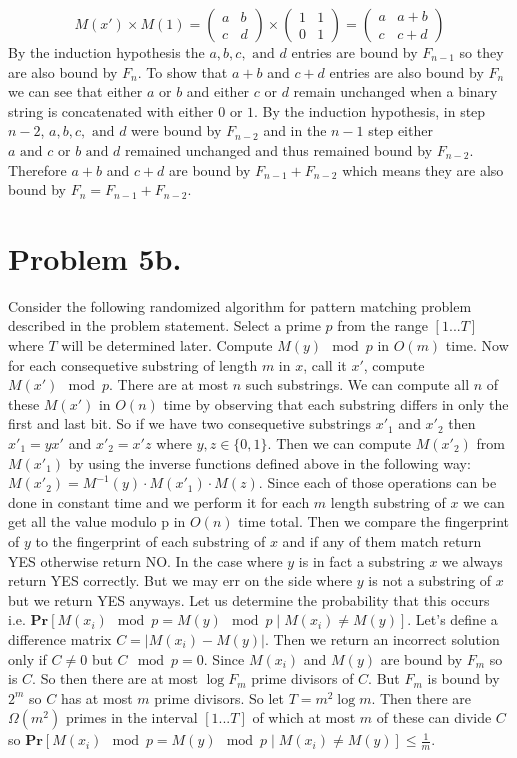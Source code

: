 \documentclass[12pt]{article}
\begin{document}
$$M(x') \times M(1) =
\left(\begin{array}{cc} a & b \\ c & d \end{array}\right) \times
\left(\begin{array}{cc} 1 & 1 \\ 0 & 1 \end{array}\right) =
\left(\begin{array}{cc} a & a+b \\ c & c+d \end{array}\right)$$
By the induction hypothesis the $a,b,c, \text{ and } d$ entries are bound by
$F_{n-1}$ so they are also bound by $F_n$. To show that $a+b$ and $c+d$ entries
are also bound by $F_n$ we can see that either $a$ or $b$ and either $c$ or $d$
remain unchanged when a binary string is concatenated with either $0$ or $1$.
By the induction hypothesis, in step $n-2$, $a, b, c, \text{ and } d$ were bound
by $F_{n-2}$ and in the $n-1$ step either $a \text{ and } c \text{ or }
b \text{ and } d$ remained unchanged and thus remained bound by $F_{n-2}$.
Therefore $a+b$ and $c+d$ are bound by $F_{n-1} + F_{n-2}$ which means they are
also bound by $F_n = F_{n-1} + F_{n-2}$.

\section*{Problem 5b.}
Consider the following randomized algorithm for pattern matching problem
described in the problem statement. Select a prime $p$ from the range $[1...T]$
where $T$ will be determined later. Compute $M(y)\mod p$ in $O(m)$ time. Now
for each consequetive substring of length $m$ in $x$, call it $x'$, compute
$M(x')\mod p$. There are at most $n$ such substrings. We can compute all
$n$ of these $M(x')$ in $O(n)$ time by observing that each substring differs in
only the first and last bit. So if we have two consequetive substrings $x'_1$
and $x'_2$ then $x'_1 = yx'$ and $x'_2 = x'z$ where $y,z\in\{0,1\}$. Then
we can compute $M(x'_2)$ from $M(x'_1)$ by using the inverse functions defined
above in the following way: $M(x'_2) = M^{-1}(y)\cdot M(x'_1)\cdot M(z)$. Since
each of those operations can be done in constant time and we perform it for each
$m$ length substring of $x$ we can get all the value modulo p in $O(n)$ time
total. Then we compare the fingerprint of $y$ to the fingerprint of each
substring of $x$ and if any of them match return YES otherwise return NO. In
the case where $y$ is in fact a substring $x$ we always return YES correctly. But
we may err on the side where $y$ is not a substring of $x$ but we return YES
anyways. Let us determine the probability that this occurs i.e.
$\textbf{Pr}[M(x_i)\mod p = M(y)\mod p \mid M(x_i) \neq M(y)]$.
Let's define a difference matrix $C = |M(x_i)-M(y)|$.
Then we return an incorrect solution only if $C \neq 0$ but $C \mod p = 0$. Since
$M(x_i)$ and $M(y)$ are bound by $F_m$ so is $C$. So then there are at most
$\log F_m$ prime divisors of $C$. But $F_m$ is bound by $2^m$ so $C$ has at most
$m$ prime divisors. So let $T = m^2\log m$. Then there are $\Omega(m^2)$ primes
in the interval $[1...T]$ of which at most $m$ of these can divide $C$ so
$\textbf{Pr}[M(x_i)\mod p = M(y)\mod p \mid M(x_i) \neq M(y)] \le \frac{1}{m}$.
\end{document}
